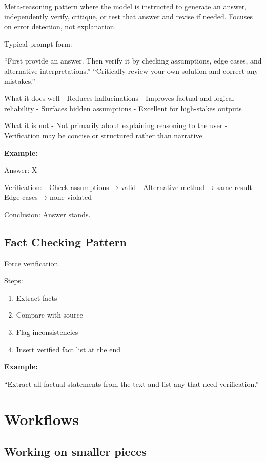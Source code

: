 \documentclass[
  letterpaper,
  DIV=11,
  numbers=noendperiod]{scrreprt}
\providecommand{\tightlist}{%
  \setlength{\itemsep}{0pt}\setlength{\parskip}{0pt}}
\begin{document}
Meta-reasoning pattern where the model is instructed to generate an
answer, independently verify, critique, or test that answer and revise
if needed. Focuses on error detection, not explanation.

Typical prompt form:

``First provide an answer. Then verify it by checking assumptions, edge
cases, and alternative interpretations.'' ``Critically review your own
solution and correct any mistakes.''

What it does well - Reduces hallucinations - Improves factual and
logical reliability - Surfaces hidden assumptions - Excellent for
high-stakes outputs

What it is not - Not primarily about explaining reasoning to the user -
Verification may be concise or structured rather than narrative

\textbf{Example:}

Answer: X

Verification: - Check assumptions → valid - Alternative method → same
result - Edge cases → none violated

Conclusion: Answer stands.

\subsection{Fact Checking Pattern}\label{fact-checking-pattern}

Force verification.

Steps:

\begin{enumerate}
\def\labelenumi{\arabic{enumi}.}
\setcounter{enumi}{1}
\tightlist
\item
  Extract facts
\item
  Compare with source
\item
  Flag inconsistencies
\item
  Insert verified fact list at the end
\end{enumerate}

\textbf{Example:}

``Extract all factual statements from the text and list any that need
verification.''

\section{Workflows}\label{workflows}

\subsection{Working on smaller pieces}\label{working-on-smaller-pieces}
\end{document}
